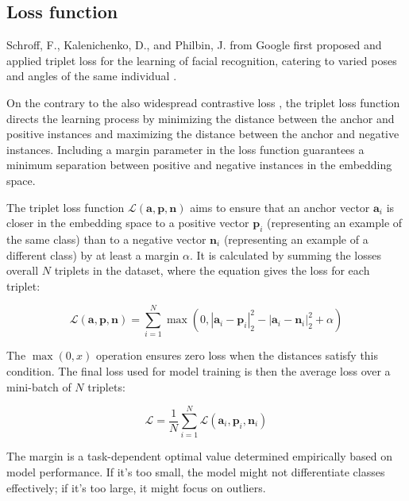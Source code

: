 \subsection{Loss function}
\label{subsec:loss-function}

Schroff, F., Kalenichenko, D., and Philbin, J. from Google first proposed and applied triplet loss for the learning of facial recognition, catering to varied poses and angles of the same individual \cite{Schroff2015FaceNet:Clustering}.

On the contrary to the also widespread contrastive loss \cite{supercontrast}, the triplet loss function directs the learning process by minimizing the distance between the anchor and positive instances and maximizing the distance between the anchor and negative instances. Including a margin parameter in the loss function guarantees a minimum separation between positive and negative instances in the embedding space.

The triplet loss function $\mathcal{L}(\mathbf{a}, \mathbf{p}, \mathbf{n})$ aims to ensure that an anchor vector $\mathbf{a}_i$ is closer in the embedding space to a positive vector $\mathbf{p}_i$ (representing an example of the same class) than to a negative vector $\mathbf{n}_i$ (representing an example of a different class) by at least a margin $\alpha$. It is calculated by summing the losses overall $N$ triplets in the dataset, where the equation gives the loss for each triplet:

\begin{equation}
\mathcal{L}(\mathbf{a}, \mathbf{p}, \mathbf{n}) = \sum_{i=1}^{N} \max \left(0, \left| \mathbf{a}_i - \mathbf{p}_i \right|_2^2 - \left| \mathbf{a}_i - \mathbf{n}_i \right|_2^2 + \alpha \right)
\end{equation}

The $\max(0, x)$ operation ensures zero loss when the distances satisfy this condition. The final loss used for model training is then the average loss over a mini-batch of $N$ triplets:

\begin{equation}
\mathcal{L} = \frac{1}{N} \sum_{i=1}^{N} \mathcal{L}(\mathbf{a}_i, \mathbf{p}_i, \mathbf{n}_i)
\end{equation}

The margin is a task-dependent optimal value determined empirically based on model performance. If it's too small, the model might not differentiate classes effectively; if it's too large, it might focus on outliers.

